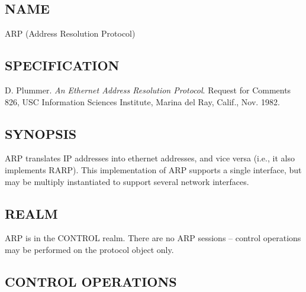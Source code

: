 %     
%
%
%
%
%

\subsection*{NAME}

\noindent ARP (Address Resolution Protocol)

\subsection*{SPECIFICATION}

\noindent D. Plummer. {\it An Ethernet Address Resolution Protocol}.
Request for Comments 826, USC Information Sciences Institute, Marina
del Ray, Calif., Nov. 1982.

\subsection*{SYNOPSIS}

\noindent ARP translates IP addresses into ethernet addresses, and
vice versa (i.e., it also implements RARP).  This implementation of
ARP supports a single interface, but may be multiply instantiated to
support several network interfaces.

\subsection*{REALM}

ARP is in the CONTROL realm.  There are no ARP sessions -- control
operations may be performed on the protocol object only.

\subsection*{CONTROL OPERATIONS}


